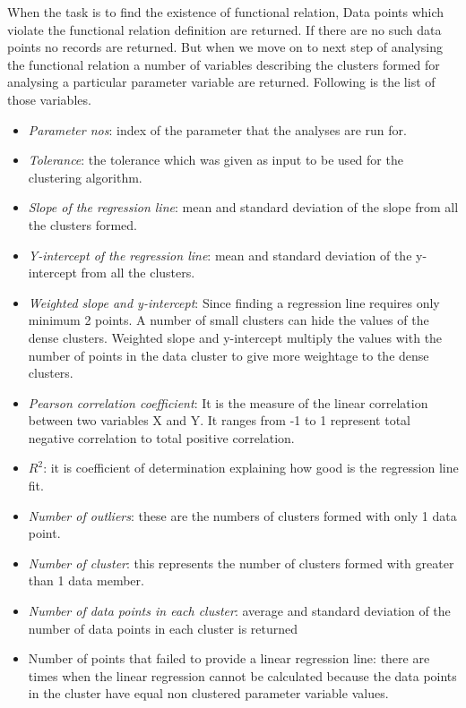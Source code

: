When the task is to find the existence of functional relation, Data points which violate the functional relation definition are returned. If there are no such data points no records are returned. But when we move on to next step of analysing the functional relation a number of variables describing the clusters formed for analysing a particular parameter variable are returned. Following is the list of those variables.

\begin{itemize}
    \item \textit{Parameter nos}: index of the parameter that the analyses are run for.
    \item \textit{Tolerance}: the tolerance which was given as input to be used for the clustering algorithm.
    \item \textit{Slope of the regression line}: mean and standard deviation of the slope from all the clusters formed.
    \item \textit{Y-intercept of the regression line}: mean and standard deviation of the y-intercept from all the clusters.
    \item \textit{Weighted slope and y-intercept}: Since finding a regression line requires only minimum 2 points. A number of small clusters can hide the values of the dense clusters. Weighted slope and y-intercept multiply the values with the number of points in the data cluster to give more weightage to the dense clusters.
    \item \textit{Pearson correlation coefficient}: It is the measure of the linear correlation between two variables X and Y. It ranges from -1 to 1 represent total negative correlation to total positive correlation.
    \item \textit{\(R^2\)}: it is coefficient of determination explaining how good is the regression line fit.
    \item \textit{Number of outliers}: these are the numbers of clusters formed with only 1 data point.
    \item \textit{Number of cluster}: this represents the number of clusters formed with greater than 1 data member.
    \item \textit{Number of data points in each cluster}: average and standard deviation of the number of data points in each cluster is returned
    \item Number of points that failed to provide a linear regression line: there are times when the linear regression cannot be calculated because the data points in the cluster have equal non clustered parameter variable values.

\end{itemize}

